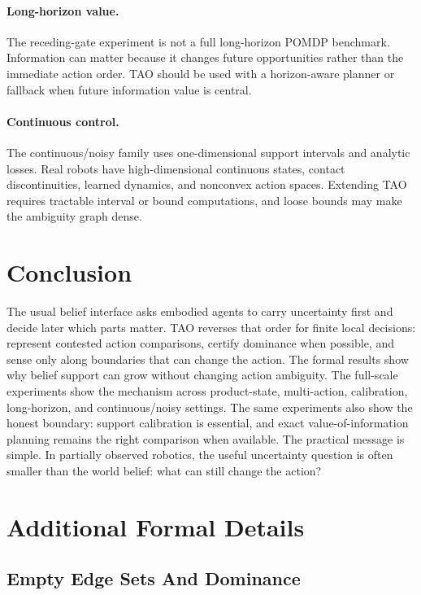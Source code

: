 \documentclass{article}
\begin{document}
\paragraph{Long-horizon value.}
The receding-gate experiment is not a full long-horizon POMDP benchmark. Information can matter because it changes future opportunities rather than the immediate action order. TAO should be used with a horizon-aware planner or fallback when future information value is central.

\paragraph{Continuous control.}
The continuous/noisy family uses one-dimensional support intervals and analytic losses. Real robots have high-dimensional continuous states, contact discontinuities, learned dynamics, and nonconvex action spaces. Extending TAO requires tractable interval or bound computations, and loose bounds may make the ambiguity graph dense.

\section{Conclusion}

The usual belief interface asks embodied agents to carry uncertainty first and decide later which parts matter. TAO reverses that order for finite local decisions: represent contested action comparisons, certify dominance when possible, and sense only along boundaries that can change the action. The formal results show why belief support can grow without changing action ambiguity. The full-scale experiments show the mechanism across product-state, multi-action, calibration, long-horizon, and continuous/noisy settings. The same experiments also show the honest boundary: support calibration is essential, and exact value-of-information planning remains the right comparison when available. The practical message is simple. In partially observed robotics, the useful uncertainty question is often smaller than the world belief: what can still change the action?




\appendix

\section{Additional Formal Details}

\subsection{Empty Edge Sets And Dominance}
\end{document}

